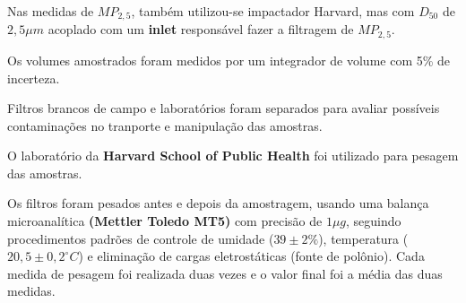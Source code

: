 Nas medidas de $MP_{2,5}$, também utilizou-se impactador Harvard, 
mas com $D_{50}$ de $2,5 \mu m$ acoplado com um \textbf{inlet} 
responsável fazer a filtragem de $MP_{2,5}$.

Os volumes amostrados foram medidos por um integrador de volume
com 5\% de incerteza.

Filtros brancos de campo e laboratórios foram separados para avaliar 
possíveis contaminações no tranporte e manipulação das amostras. 

O laboratório da \textbf{Harvard School of Public Health} foi
utilizado para pesagem das amostras.

Os filtros foram pesados antes e depois da amostragem, usando uma balança 
microanalítica \textbf{(Mettler Toledo MT5)} com precisão de $1 \mu g$, 
seguindo procedimentos padrões de controle de umidade ($39 \pm 2 \%$), 
temperatura ($20,5 \pm 0,2 ^{\circ} C$) e eliminação de cargas eletrostáticas 
(fonte de polônio). 
Cada medida de pesagem foi realizada duas vezes e o valor final foi a média das 
duas medidas. 
